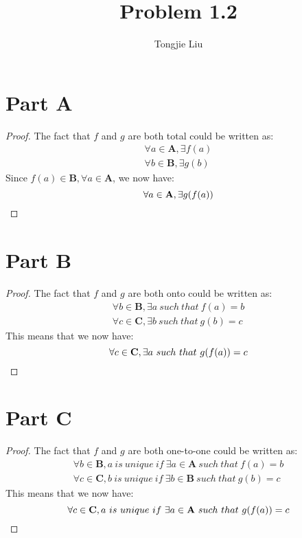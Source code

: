 \documentclass{article}
\title{Problem 1.2}
\author{Tongjie Liu}
\begin{document}
\maketitle


\section{Part A}
\begin{proof}
	The fact that $f$ and $g$ are both total could be written as:
	\begin{align*}
		\forall a \in \mathbf{A}, \exists f(a) \\
		\forall b \in \mathbf{B}, \exists g(b)
	\end{align*}
	Since $f(a) \in \mathbf{B}, \forall a \in \mathbf{A}$, we now have:
	\begin{equation*}
		\forall a \in \mathbf{A}, \exists g(f(a)) \qedhere
	\end{equation*}
\end{proof}


\section{Part B}
\begin{proof}
	The fact that $f$ and $g$ are both onto could be written as:
	\begin{align*}
		\forall b \in \mathbf{B}, \exists a \  
			such \  that \  f(a) = b \\
		\forall c \in \mathbf{C}, \exists b \ 
			such \  that \  g(b) = c
	\end{align*}
	This means that we now have:
	\begin{equation*}
		\forall c \in \mathbf{C}, \exists a \ 
			such \  that \  g(f(a)) = c \qedhere
	\end{equation*}
\end{proof}


\section{Part C}
\begin{proof}
	The fact that $f$ and $g$ are both one-to-one could be written as:
	\begin{align*}
		\forall b \in \mathbf{B}, a \  is \  unique \ 
			if \  \exists a \in \mathbf{A} \ 
			such \  that \  f(a) = b \\
		\forall c \in \mathbf{C}, b \  is \  unique \ 
			if \  \exists b \in \mathbf{B} \ 
			such \  that \  g(b) = c
	\end{align*}
	This means that we now have:
	\begin{equation*}
		\forall c \in \mathbf{C}, a \  is \  unique \ 
			if \  \exists a \in \mathbf{A} \ 
			such \  that \  g(f(a)) = c \qedhere
	\end{equation*}
\end{proof}
\end{document}
